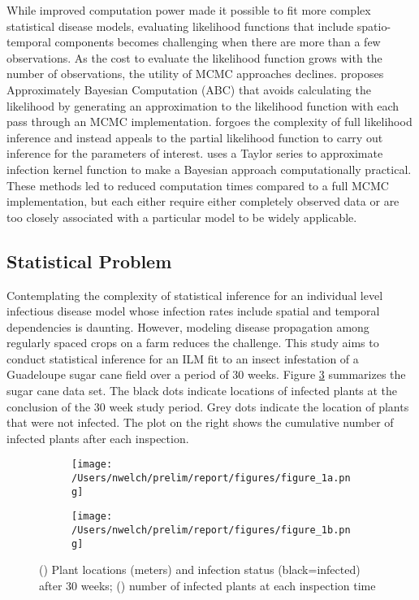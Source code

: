\documentclass{uwstat572}
\begin{document}
While improved computation power made it possible to fit more complex statistical disease models, evaluating likelihood functions that include spatio-temporal components becomes challenging when there are more than a few observations. 
As the cost to evaluate the likelihood function grows with the number of observations, the utility of MCMC approaches declines.
\citet{McKinley} proposes Approximately Bayesian Computation (ABC) that avoids calculating the likelihood by generating an approximation to the likelihood function with each pass through an MCMC implementation. 
\citet{Diggle} forgoes the complexity of full likelihood inference and instead appeals to the partial likelihood function to carry out inference for the parameters of interest. 
\citet{Deardon} uses a Taylor series to approximate infection kernel function to make a Bayesian approach computationally practical. 
These methods led to reduced computation times compared to a full MCMC implementation, but each either require either completely observed data or are too closely associated with a particular model to be widely applicable.

\subsection{Statistical Problem}
Contemplating the complexity of statistical inference for an individual level infectious disease model whose infection rates include spatial and temporal dependencies is daunting.
However, modeling disease propagation among regularly spaced crops on a farm reduces the challenge. 
This study aims to conduct statistical inference for an ILM fit to an insect infestation of a Guadeloupe sugar cane field over a period of 30 weeks.
Figure \ref{fig:data_plot} summarizes the sugar cane data set. 
The black dots indicate locations of infected plants at the conclusion of the 30 week study period. 
Grey dots indicate the location of plants that were not infected. 
The plot on the right shows the cumulative number of infected plants after each inspection.

\begin{figure}[h]
	\centering
	\begin{subfigure}[b]{0.49\textwidth}
		\texttt{[image: /Users/nwelch/prelim/report/figures/figure\_1a.png]}
		\caption{}
		\label{fig:plants}
	\end{subfigure}
	\hfill
	\begin{subfigure}[b]{0.49\textwidth}
		\texttt{[image: /Users/nwelch/prelim/report/figures/figure\_1b.png]}
		\caption{}
		\label{fig:cum_infection}
	\end{subfigure}
	\caption{() Plant locations (meters) and infection status (black=infected) after 30 weeks; () number of infected plants at each inspection time}
	\label{fig:data_plot}
\end{figure} 
\end{document}
